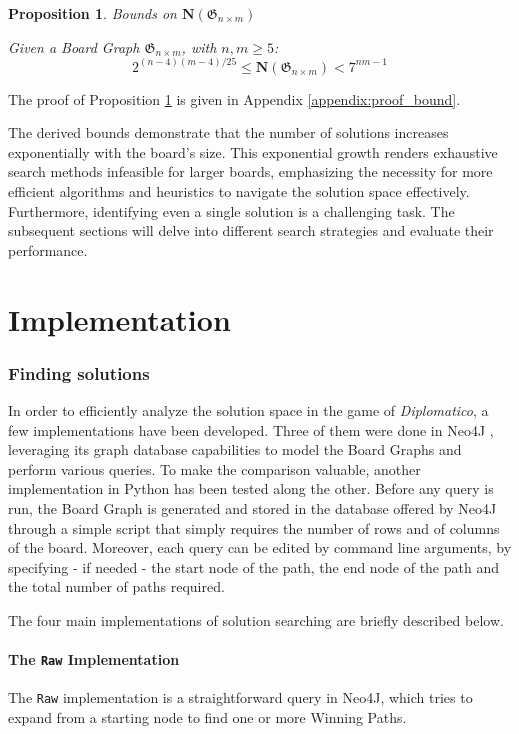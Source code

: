 \documentclass[conference]{IEEEtran}
\newtheorem{proposition}{Proposition}[section]
\begin{document}
\begin{proposition}{Bounds on $\mathbf{N}(\mathfrak{G}_{n \times m})$}{}
\label{prop:bounds_number_of_solutions}

Given a Board Graph $\mathfrak{G}_{n \times m}$, with $n, m \ge 5$:
$$
    2^{(n - 4)(m - 4)/25} \le \mathbf{N}(\mathfrak{G}_{n \times m}) < 7^{nm - 1}
$$
\end{proposition}

The proof of Proposition \ref{prop:bounds_number_of_solutions} is given in Appendix \ref{appendix:proof_bound}.

The derived bounds demonstrate that the number of solutions increases exponentially with the board's size. This exponential growth renders exhaustive search methods infeasible for larger boards, emphasizing the necessity for more efficient algorithms and heuristics to navigate the solution space effectively. 
Furthermore, identifying even a single solution is a challenging task. The subsequent sections will delve into different search strategies and evaluate their performance.

\section{Implementation}									\label{sec:implementation}
\subsubsection{Finding solutions}
In order to efficiently analyze the solution space in the game of \textit{Diplomatico}, a few implementations have been developed.
Three of them were done in Neo4J \cite{neo4j}, leveraging its graph database capabilities to model the Board Graphs and perform various queries. To make the comparison valuable, another implementation in Python has been tested along the other.
Before any query is run, the Board Graph is generated and stored in the database offered by Neo4J through a simple script that simply requires the number of rows and of columns of the board.
Moreover, each query can be edited by command line arguments, by specifying - if needed - the start node of the path, the end node of the path and the total number of paths required.

The four main implementations of solution searching are briefly described below.

\paragraph{The \texttt{Raw} Implementation}
The \texttt{Raw} implementation is a straightforward query in Neo4J, which tries to expand from a starting node to find one or more Winning Paths.
\end{document}

